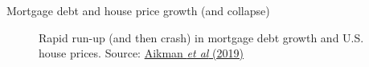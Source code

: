 \begin{frame}{Mortgage debt and house price growth (and collapse)}

\begin{figure}
\begin{center}


\caption{\label{fig:L4_aikman_et_al_house_prices_mortage} Rapid run-up (and then crash) in mortgage debt growth and U.S. house prices. Source: \href{https://pubs.aeaweb.org/doi/pdfplus/10.1257/jep.33.1.107}{Aikman \emph{et al} (2019)}}

\end{center}
\end{figure}


\end{frame}
